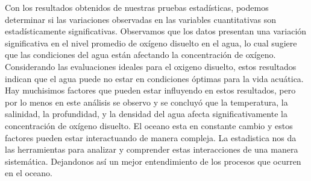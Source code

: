 
Con los resultados obtenidos de nuestras pruebas estadísticas, podemos determinar si las variaciones observadas en las variables cuantitativas son estadísticamente significativas. Observamos que los datos presentan una variación significativa en el nivel promedio de oxígeno disuelto en el agua, lo cual sugiere que las condiciones del agua están afectando la concentración de oxígeno. Considerando las evaluaciones ideales para el oxigeno disuelto, estos resultados indican que el agua puede no estar en condiciones óptimas para la vida acuática. Hay muchisimos factores que pueden estar influyendo en estos resultados, pero por lo menos en este análisis se observo y se concluyó que la temperatura, la salinidad, la profundidad, y la densidad del agua afecta significativamente la concentración de oxígeno disuelto. El oceano esta en constante cambio y estos factores pueden estar interactuando de manera compleja. La estadistica nos da las herramientas para analizar y comprender estas interacciones de una manera sistemática. Dejandonos así un mejor entendimiento de los procesos que ocurren en el oceano.